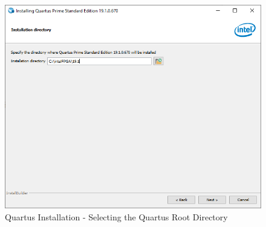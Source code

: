 \documentclass[11pt, twoside, pdftex]{article}
\begin{document}
\begin{enumerate}
	\begin{figure} [H]
	\begin{center}
	\includegraphics[scale = 0.7]{figures/fig_install_2.png}
	\end{center}
	\caption{Quartus Installation - Selecting the Quartus Root Directory}
	\label{fig:quartus_install_2}
	\end{figure}
	

\end{enumerate}
\end{document}
